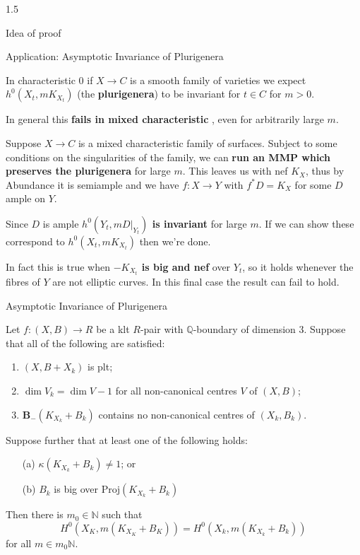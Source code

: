\documentclass[final]{beamer}
\newlength{\colwidth}
\begin{document}
\begin{frame}[t, fragile]
\begin{columns}[t]
\begin{column}{1.5\colwidth}
\begin{block}{Idea of proof}
				
			\end{block}
			
			\begin{block}{Application: Asymptotic Invariance of Plurigenera}
				
				In characteristic $0$ if $X \to C$ is a smooth family of varieties we expect $h^{0}(X_{t},mK_{X_{t}})$ (the \textbf{plurigenera}) to be invariant for $t \in C$ for $m > 0$.
				
				In general this \textbf{fails in mixed characteristic} \cite{Bri20}, even for arbitrarily large $m$.
				
				Suppose $X \to C$ is a mixed characteristic family of surfaces. Subject to some conditions on the singularities of the family, we can \textbf{run an MMP which preserves the plurigenera} for large $m$. This leaves us with nef $K_{X}$, thus by Abundance it is semiample and we have $f:X \to Y$ with $f^{*}D=K_{X}$ for some $D$ ample on $Y$.
				
				Since $D$ is ample \textbf{$h^{0}(Y_{t},mD|_{Y_{t}})$ is invariant} for large $m$. If we can show these correspond to $h^{0}(X_{t},mK_{X_{t}})$ then we're done.
				
				In fact this is true when \textbf{$-K_{X_{t}}$ is big and nef} over $Y_{t}$, so it holds whenever the fibres of $Y$ are not elliptic curves. In this final case the result can fail to hold.
				
			\end{block}
			
			\begin{alertblock}{Asymptotic Invariance of Plurigenera}
				
				Let $f:(X,B)\to R$ be a klt $R$-pair with $\mathbb{Q}$-boundary of dimension $3$. Suppose that all of the following are satisfied:
				
				\begin{enumerate}
					\item $(X,B+X_{k})$ is plt;
					\item $\dim V_{k}=\dim V -1$ for all non-canonical centres $V$ of $(X,B)$;
					\item $\mathbf{B}_{-}(K_{X_k}+B_k)$ contains no non-canonical centres of $(X_k,B_k)$.
				\end{enumerate}
				
				Suppose further that at least one of the following holds:
				\begin{enumerate}
					\item[(a)] $\kappa(K_{X_{k}}+B_{k}) \neq 1$; or
					\item[(b)] $B_{k}$ is big over $\text{Proj}(K_{X_{k}}+B_{k})$
				\end{enumerate}	
				Then there is $m_{0} \in \mathbb{N}$ such that 
				$$H^{0}(X_{K},m(K_{X_{K}}+B_{K}))=H^{0}(X_{k},m(K_{X_{k}}+B_{k}))$$
				for all $m \in m_{0}\mathbb{N}$.
				

\end{alertblock}
\end{column}
\end{columns}
\end{frame}
\end{document}
